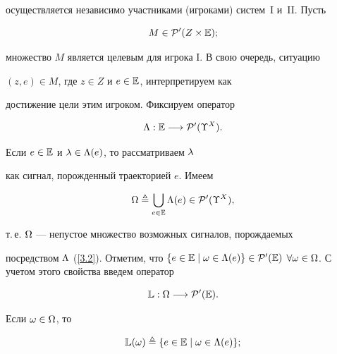 осуществляется независимо участниками (игроками) систем~I и~II. Пусть


\begin{equation}\label{3.1}


M \in {\cal{P}}'(Z \times \Bbb{E});


\end{equation}


множество $M$ является целевым для игрока I. В свою очередь, ситуацию


$(z,e) \in M$, где $z \in Z$ и $e \in \Bbb{E}$, интерпретируем как


достижение цели этим игроком. Фиксируем оператор


\begin{equation}\label{3.2}


\Ld:\Bbb{E} \lo {\cal{P}}'(\Upsilon^X).


\end{equation}


Если $e \in \Bbb{E}$ и $\lambda \in {\Lambda}(e)$, то рассматриваем $\lambda$


как сигнал, порожденный траекторией $e$. Имеем


\begin{equation}\label{3.3}


\Om \triangleq \bigcup\limits_{e \in \Bbb{E}}{\Ld}(e) \in


{\cal{P}}'({\Upsilon}^X),


\end{equation}


т.\,е. $\Omega$ --- непустое множество возможных сигналов, порождаемых


посредством $\Ld$ (\ref{3.2}). Отметим, что $\{e \in \Bbb{E} \mid


\omega \in {\Ld}(e)\} \in {\cal{P}}'(\Bbb{E})$ $\fo{\omega}


\in \Om$. С учетом этого свойства введем оператор


\begin{equation}\label{3.4}


\Bbb{L}: \Om \lo {\cal{P}}'(\Bbb{E}).


\end{equation}


Если $\omega \in \Omega$, то


\begin{equation}\label{3.5}


\Bbb{L}(\omega) \triangleq \{e \in \Bbb{E} \mid \omega \in


{\Ld}(e)\};


\end{equation}


